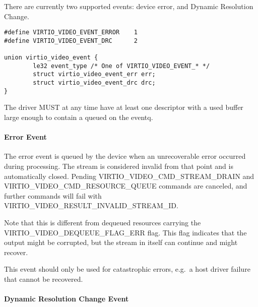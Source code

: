 There are currently two supported events: device error, and Dynamic
Resolution Change.

\begin{lstlisting}
#define VIRTIO_VIDEO_EVENT_ERROR    1
#define VIRTIO_VIDEO_EVENT_DRC      2

union virtio_video_event {
        le32 event_type /* One of VIRTIO_VIDEO_EVENT_* */
        struct virtio_video_event_err err;
        struct virtio_video_event_drc drc;
}
\end{lstlisting}


The driver MUST at any time have at least one descriptor with a used
buffer large enough to contain a 
queued on the eventq.

\paragraph{Error Event}\label{sec:Device Types / Video Device / Device Operation / Device Operation: Event Virtqueue / Error Event}

The error event is queued by the device when an unrecoverable error
occurred during processing. The stream is considered invalid from that
point and is automatically closed. Pending
VIRTIO\_VIDEO\_CMD\_STREAM\_DRAIN and
VIRTIO\_VIDEO\_CMD\_RESOURCE\_QUEUE commands are canceled, and further
commands will fail with VIRTIO\_VIDEO\_RESULT\_INVALID\_STREAM\_ID.

Note that this is different from dequeued resources carrying the
VIRTIO\_VIDEO\_DEQUEUE\_FLAG\_ERR flag. This flag indicates that the
output might be corrupted, but the stream in itself can continue and
might recover.

This event should only be used for catastrophic errors, e.g.~a host
driver failure that cannot be recovered.

\paragraph{Dynamic Resolution Change Event}\label{sec:Device Types / Video Device / Device Operation / Device Operation: Event Virtqueue / Dynamic Resolution Change Event}

